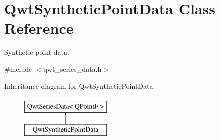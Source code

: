 \hypertarget{class_qwt_synthetic_point_data}{\section{Qwt\-Synthetic\-Point\-Data Class Reference}
\label{class_qwt_synthetic_point_data}
}


Synthetic point data.  




{\ttfamily \#include $<$qwt\-\_\-series\-\_\-data.\-h$>$}

Inheritance diagram for Qwt\-Synthetic\-Point\-Data\-:\begin{figure}[H]
\begin{center}
\leavevmode
\includegraphics[height=2.000000cm]{class_qwt_synthetic_point_data}
\end{center}
\end{figure}
